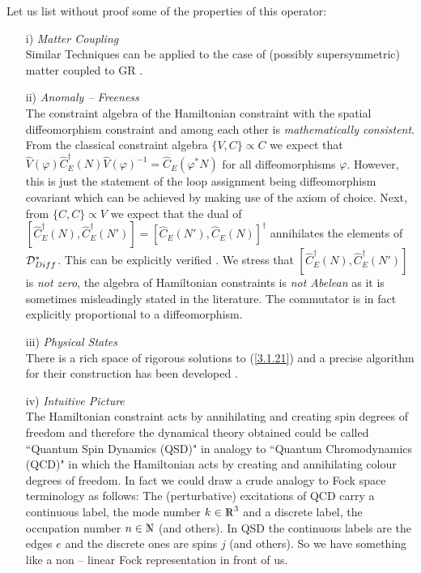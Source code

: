 \documentclass[12pt]{report}
\def\Nl{{\mathchoice
{\setbox0=\hbox{$\displaystyle\rm N$}\hbox{\hbox to0pt
{\kern0.4\wd0\vrule height0.9\ht0\hss}\box0}}
{\setbox0=\hbox{$\textstyle\rm N$}\hbox{\hbox to0pt
{\kern0.4\wd0\vrule height0.9\ht0\hss}\box0}}
{\setbox0=\hbox{$\scriptstyle\rm N$}\hbox{\hbox to0pt
{\kern0.4\wd0\vrule height0.9\ht0\hss}\box0}}
{\setbox0=\hbox{$\scriptscriptstyle\rm N$}\hbox{\hbox to0pt
{\kern0.4\wd0\vrule height0.9\ht0\hss}\box0}}}}
\def\Rl{{\mathchoice
{\setbox0=\hbox{$\displaystyle\rm R$}\hbox{\hbox to0pt
{\kern0.4\wd0\vrule height0.9\ht0\hss}\box0}}
{\setbox0=\hbox{$\textstyle\rm R$}\hbox{\hbox to0pt
{\kern0.4\wd0\vrule height0.9\ht0\hss}\box0}}
{\setbox0=\hbox{$\scriptstyle\rm R$}\hbox{\hbox to0pt
{\kern0.4\wd0\vrule height0.9\ht0\hss}\box0}}
{\setbox0=\hbox{$\scriptscriptstyle\rm R$}\hbox{\hbox to0pt
{\kern0.4\wd0\vrule height0.9\ht0\hss}\box0}}}}
\begin{document}
Let us list without proof some of the properties of this operator:
%
\begin{itemize}
%
\item[i)] {\it Matter Coupling}\\
Similar Techniques can be applied to the case of (possibly 
supersymmetric) matter coupled to GR \cite{41}.
%
\item[ii)] {\it Anomaly -- Freeness}\\
The constraint algebra of the Hamiltonian constraint with the spatial
diffeomorphism constraint and among each other is {\it mathematically
consistent}. From the classical constraint algebra $\{V,C\}\propto C$ 
we expect that 
$\hat{V}(\varphi)\hat{C}^\dagger_E(N)\hat{V}(\varphi)^{-1}=
\hat{C}_E(\varphi^\ast N)$ for all diffeomorphisms $\varphi$. However,
this is just the statement of the loop assignment being diffeomorphism 
covariant which can be achieved by making use of the axiom of choice.
Next, from $\{C,C\}\propto V$ we expect that the dual of 
$[\hat{C}^\dagger_E(N),\hat{C}^\dagger_E(N')]=
[\hat{C}_E(N'),\hat{C}_E(N)]^\dagger$ annihilates the elements 
of ${\cal D}_{Diff}^\ast$. This can be explicitly verified \cite{41}. 
We stress
that $[\hat{C}^\dagger_E(N),\hat{C}^\dagger_E(N')]$ is {\it not zero},
the algebra of Hamiltonian constraints is {\it not Abelean} as it is 
sometimes misleadingly stated in the literature. The commutator 
is in fact explicitly proportional to a diffeomorphism.
%
\item[iii)] {\it Physical States}\\
There is a rich space of rigorous solutions to (\ref{3.1.21}) and a precise 
algorithm for their construction has been developed \cite{41}.
%
\item[iv)] {\it Intuitive Picture}\\
The Hamiltonian constraint acts by annihilating and creating spin degrees 
of freedom and therefore the dynamical theory obtained could  be called 
``Quantum Spin Dynamics (QSD)" in analogy to ``Quantum 
Chromodynamics (QCD)" in which the Hamiltonian acts by creating and 
annihilating colour degrees of freedom. In fact we could draw a crude 
analogy to Fock space terminology as follows: The (perturbative) 
excitations of QCD carry a continuous label, the mode number $k\in \Rl^3$ 
and a discrete label, the occupation number $n\in\Nl$ (and others). In QSD 
the continuous labels are the edges $e$ and the discrete ones are spins $j$
(and others). So we have something like a non -- linear Fock 
representation in front of us. 


\end{itemize}
\end{document}
